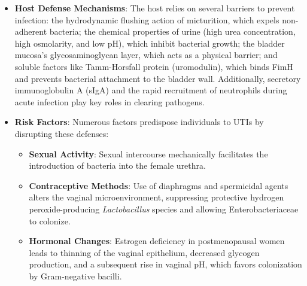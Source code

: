 \begin{itemize}
\begin{itemize}
        \item \textbf{Intracellular Invasion}: Upon binding, UPEC can undergo receptor-mediated endocytosis, invading the superficial facet cells of the bladder. Once inside, the bacteria replicate rapidly, forming dense biofilm-like structures known as Intracellular Bacterial Communities (IBCs). This intracellular niche protects the pathogens from the mechanical flushing of urine, host immune detection, and the penetration of many systemically administered antibiotics, serving as a reservoir for recurrent infections.
        \item \textbf{Toxins and Siderophores}: Pathogenic bacteria secrete toxins, such as hemolysin and cytotoxic necrotizing factor 1 (CNF1), which induce host cell lysis, facilitate tissue invasion, and impair immune cell function. Furthermore, to survive in the iron-restricted environment of the urinary tract, uropathogens produce siderophores (e.g., enterobactin, aerobactin) to scavenge iron from the host.
    \end{itemize}
    \item \textbf{Host Defense Mechanisms}: The host relies on several barriers to prevent infection: the hydrodynamic flushing action of micturition, which expels non-adherent bacteria; the chemical properties of urine (high urea concentration, high osmolarity, and low pH), which inhibit bacterial growth; the bladder mucosa's glycosaminoglycan layer, which acts as a physical barrier; and soluble factors like Tamm-Horsfall protein (uromodulin), which binds FimH and prevents bacterial attachment to the bladder wall. Additionally, secretory immunoglobulin A (sIgA) and the rapid recruitment of neutrophils during acute infection play key roles in clearing pathogens.
    \item \textbf{Risk Factors}: Numerous factors predispose individuals to UTIs by disrupting these defenses:
    \begin{itemize}
        \item \textbf{Sexual Activity}: Sexual intercourse mechanically facilitates the introduction of bacteria into the female urethra.
        \item \textbf{Contraceptive Methods}: Use of diaphragms and spermicidal agents alters the vaginal microenvironment, suppressing protective hydrogen peroxide-producing \textit{Lactobacillus} species and allowing Enterobacteriaceae to colonize.
        \item \textbf{Hormonal Changes}: Estrogen deficiency in postmenopausal women leads to thinning of the vaginal epithelium, decreased glycogen production, and a subsequent rise in vaginal pH, which favors colonization by Gram-negative bacilli.

\end{itemize}
\end{itemize}
